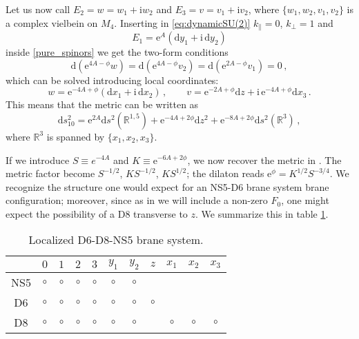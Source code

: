 \documentclass[12pt]{article}
\newcommand{\R}{\mathbb{R}}
\newcommand{\dd}{\mathrm{d}}
\newcommand{\e}{\mathrm{e}}
\newcommand{\ii}{\mathrm{i}}
\begin{document}
Let us now call $E_2 = w = w_1 + \ii w_2$ and $E_3 = v = v_1 + \ii v_2$, where $\{w_1,w_2,v_1,v_2\}$ is a complex vielbein on $M_4$. Inserting in \eqref{eq:dynamicSU(2)}  $k_\parallel= 0$, $k_\perp = 1$ and 
\begin{equation}\label{eq:E1y}
	E_1=\e^A (\dd y_1 + \ii \, \dd y_2)
\end{equation}
inside \eqref{pure_spinors} we get the two-form conditions
\begin{equation}
\dd (\e^{4A - \phi} w) = \dd (\e^{4A - \phi} v_2)= \dd (\e^{2A - \phi} v_1) = 0\,,
\end{equation}
which can be solved introducing local coordinates:
\begin{equation}
w = \e^{-4A + \phi} (\dd x_1+ \ii \, \dd x_2) \, , \qquad v = \e^{-2A + \phi} \dd z+ \ii \, \e^{-4A + \phi} \dd x_3 \, .
\end{equation}
This means that the metric can be written as
\begin{equation}
\label{eq:ima_metric}
\dd s^2_{10} = \e^{2A} \dd s^2 (\R^{1,5})+ \e^{-4A+2\phi} \dd z^2+ \e^{-8A+2\phi} \dd s^2(\R^3) \, ,
\end{equation}
where $\R^3$ is spanned by $\{x_1,x_2,x_3\}$. 

If we introduce $S\equiv e^{-4A}$ and $K\equiv \e^{-6A+2\phi}$, we now recover the metric in \cite[(2.2)]{imamura}. The metric factor become $S^{-1/2}$, $K S^{-1/2}$, $K S^{1/2}$; the dilaton reads $\e^{\phi}= K^{1/2} S^{-3/4}$. We recognize the structure one would expect for an NS5-D6 brane system brane configuration; moreover, since as in \cite{imamura} we will include a non-zero $F_0$, one might expect the possibility of a D8 transverse to $z$. We summarize this in table \ref{table:D6-D8-NS5}. 
\begin{table}[h]
	\centering
	\begin{tabular}{ccccccccccc} 
		\hline
		 & $0$ & $1$ & $2$ & $3$ & $y_1$ & $y_2$ & $z$ & $x_1$ & $x_2$ & $x_3$      \\ 
		\hline
		 NS5 & $\circ$ &$\circ$ &$\circ$ & $\circ$ & $\circ$ & $\circ$ &  &  &  &    \\ 
		 D6 & $\circ$ &$\circ$ &$\circ$ &$\circ$ & $\circ$ & $\circ$ & $\circ$  &  &  &    \\ 
		 D8 & $\circ$ &$\circ$ &$\circ$ &$\circ$ & $\circ$ & $\circ$ &  & $\circ$  & $\circ$  & $\circ$    
		\\ \hline
	\end{tabular}
	\caption{Localized D6-D8-NS5 brane system.}
	\label{table:D6-D8-NS5}
\end{table}
\end{document}
